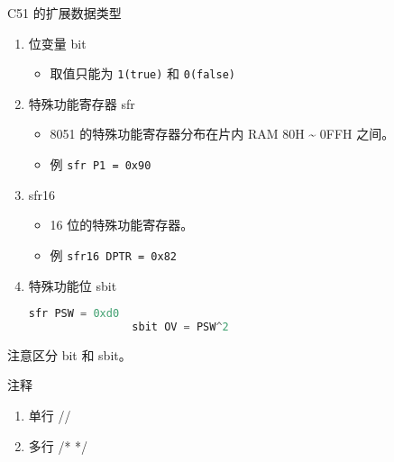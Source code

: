 \documentclass{beamer}
\begin{document}
\begin{frame}[fragile]{C51 的扩展数据类型}
    \begin{enumerate}

        \item
            位变量 bit

            \begin{itemize}

                \item
                    取值只能为 \texttt{1(true)} 和 \texttt{0(false)}
            \end{itemize}
            \pause
        \item
            特殊功能寄存器 sfr

            \begin{itemize}

                \item
                    8051 的特殊功能寄存器分布在片内 RAM 80H \textasciitilde{} 0FFH
                    之间。
                \item
                    例 \texttt{sfr\ P1\ =\ 0x90}
            \end{itemize}
            \pause
        \item
            sfr16

            \begin{itemize}

                \item
                    16 位的特殊功能寄存器。
                \item
                    例 \texttt{sfr16\ DPTR\ =\ 0x82}
            \end{itemize}
            \pause
        \item
            特殊功能位 sbit

            \pause
            \begin{lstlisting}[language=C]
                sfr PSW = 0xd0
                sbit OV = PSW^2
            \end{lstlisting}

    \end{enumerate}

    注意区分 bit 和 sbit。

\end{frame}

\begin{frame}{注释}
    \begin{enumerate}
        \item
            单行 //
        \item
            多行 /* */
    \end{enumerate}
\end{frame}
\end{document}
